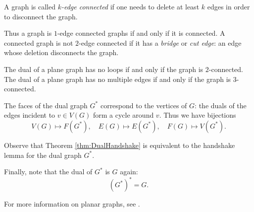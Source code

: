 \begin{page}
\setcounter{section}{3}
\setcounter{subsection}{4}
\setcounter{dfn}{12}
\label{portion:313}

\begin{dfn}
A graph is called \emph{$k$-edge connected} if one needs to delete at least $k$ edges in order to disconnect the graph.
\end{dfn}

\end{page}

\begin{page}
\setcounter{section}{3}
\setcounter{subsection}{4}
\setcounter{dfn}{12}
\label{portion:314}

Thus a graph is $1$-edge connected graphs if and only if it is connected.
A connected graph is not $2$-edge connected if it has a \emph{bridge} or \emph{cut edge}: an edge whose deletion disconnects the graph.


\end{page}

\begin{page}
\setcounter{section}{3}
\setcounter{subsection}{4}
\setcounter{dfn}{13}
\label{portion:316}

\begin{lem}
The dual of a plane graph has no loops if and only if the graph is $2$-connected.
The dual of a plane graph has no multiple edges if and only if the graph is $3$-connected.
\end{lem}

\end{page}

\begin{page}
\setcounter{section}{4}
\setcounter{subsection}{0}
\setcounter{dfn}{13}
\label{portion:317}


The faces of the dual graph $G^*$ correspond to the vertices of $G$:
the duals of the edges incident to $v \in V(G)$ form a cycle around $v$.
Thus we have bijections
\[
V(G) \mapsto F(G^*), \quad E(G) \mapsto E(G^*), \quad F(G) \mapsto V(G^*).
\]

Observe that Theorem \ref{thm:DualHandshake} is equivalent to the handshake lemma for the dual graph $G^*$.

Finally, note that the dual of $G^*$ is $G$ again:
\[
(G^*)^* = G.
\]

\bigskip

For more information on planar graphs, see \cite[Chapter 10]{BM}.





\end{page}

